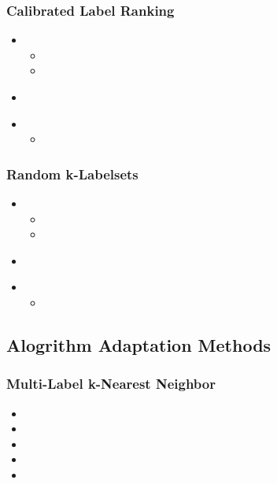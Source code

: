 \documentclass{beamer}
\begin{document}
\begin{frame}
\frametitle{Calibrated Label Ranking}
\begin{itemize}
	\item <2-> 
	\begin{itemize}
		\item 
		\item <4-> 
	\end{itemize}
\end{itemize}
\begin{itemize}
	\item<5-> 
\end{itemize}

\begin{itemize}
	\item <7-> 
	\begin{itemize}
		\item <8-> 
	\end{itemize}
\end{itemize}
\end{frame}
\begin{frame}
\frametitle{Random k-Labelsets}
\begin{itemize}
	\item <2-> 
	\begin{itemize}
		\item 
		\item <4-> 
	\end{itemize}
\end{itemize}
\begin{itemize}
	\item<5-> 
\end{itemize}

\begin{itemize}
	\item <7-> 
	\begin{itemize}
		\item <8-> 
	\end{itemize}
\end{itemize}
\end{frame}

\subsection{Alogrithm Adaptation Methods}

\begin{frame}
	\frametitle{Multi-Label k-Nearest Neighbor}
	\begin{itemize}
		\item <2-> 
		\item <3-> 
		\item <4-> 
		\item<5-> 
		\item <6-> 
	\end{itemize}
\end{frame}
\end{document}
